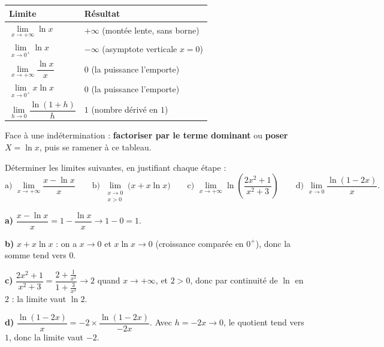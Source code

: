 \documentclass[11pt]{article}
\begin{document}
\begin{aretenir}
\begin{center}
\begin{tabularx}{\linewidth}{|X|X|}
\hline
\rowcolor{popblueL} \textbf{Limite} & \textbf{Résultat} \\
\hline
$\lim\limits_{x \to +\infty} \ln x$ & $+\infty$ (montée lente, sans borne) \\
\hline
$\lim\limits_{x \to 0^+} \ln x$ & $-\infty$ (asymptote verticale $x = 0$) \\
\hline
$\lim\limits_{x \to +\infty} \dfrac{\ln x}{x}$ & $0$ (la puissance l'emporte) \\
\hline
$\lim\limits_{x \to 0^+} x \ln x$ & $0$ (la puissance l'emporte) \\
\hline
$\lim\limits_{h \to 0} \dfrac{\ln(1+h)}{h}$ & $1$ (nombre dérivé en $1$) \\
\hline
\end{tabularx}
\end{center}
Face à une indétermination : \textbf{factoriser par le terme dominant} ou \textbf{poser $X = \ln x$}, puis se ramener à ce tableau.
\end{aretenir}

\begin{exercice}
Déterminer les limites suivantes, en justifiant chaque étape :
\[
\text{a) } \lim_{x \to +\infty} \frac{x - \ln x}{x} \qquad
\text{b) } \lim_{\substack{x \to 0 \\ x > 0}} \bigl(x + x\ln x\bigr) \qquad
\text{c) } \lim_{x \to +\infty} \ln\left(\frac{2x^2+1}{x^2+3}\right) \qquad
\text{d) } \lim_{x \to 0} \frac{\ln(1 - 2x)}{x}.
\]
\end{exercice}

\begin{corrige}
\textbf{a)} $\dfrac{x - \ln x}{x} = 1 - \dfrac{\ln x}{x} \to 1 - 0 = 1$.

\textbf{b)} $x + x\ln x$ : on a $x \to 0$ et $x\ln x \to 0$ (croissance comparée en $0^+$), donc la somme tend vers $0$.

\textbf{c)} $\dfrac{2x^2+1}{x^2+3} = \dfrac{2+\frac{1}{x^2}}{1+\frac{3}{x^2}} \to 2$ quand $x \to +\infty$, et $2 > 0$, donc par continuité de $\ln$ en $2$ : la limite vaut $\ln 2$.

\textbf{d)} $\dfrac{\ln(1-2x)}{x} = -2 \times \dfrac{\ln(1-2x)}{-2x}$. Avec $h = -2x \to 0$, le quotient tend vers $1$, donc la limite vaut $-2$.
\end{corrige}
\end{document}
